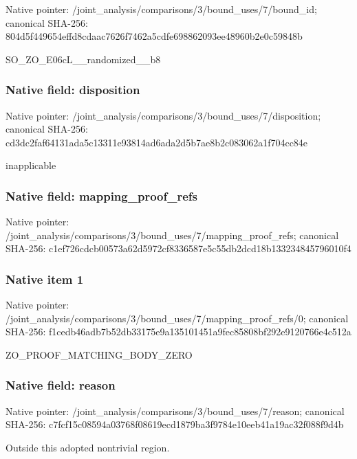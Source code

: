 \documentclass[10pt,a4paper]{article}
\begin{document}
Native pointer: /joint\_analysis/comparis\allowbreak{}ons/3/bound\_uses/7/bound\allowbreak{}\_id; canonical SHA-256: 804d5f449654effd8cdaac76\allowbreak{}26f7462a5cdfe698862093ee\allowbreak{}48960b2e0c59848b


SO\_ZO\_E06cL\_\_randomized\_\_b8


\subsubsection{Native field: disposition}


Native pointer: /joint\_analysis/comparis\allowbreak{}ons/3/bound\_uses/7/dispo\allowbreak{}sition; canonical SHA-256: cd3dc2faf64131ada5c13311\allowbreak{}e93814ad6ada2d5b7ae8b2c0\allowbreak{}83062a1f704cc84e


inapplicable


\subsubsection{Native field: mapping\_proof\_refs}


Native pointer: /joint\_analysis/comparis\allowbreak{}ons/3/bound\_uses/7/mappi\allowbreak{}ng\_proof\_refs; canonical SHA-256: c1ef726cdcb00573a62d5972\allowbreak{}cf8336587e5c55db2dcd18b1\allowbreak{}33234845796010f4



\subsubsection{Native item 1}


Native pointer: /joint\_analysis/comparis\allowbreak{}ons/3/bound\_uses/7/mappi\allowbreak{}ng\_proof\_refs/0; canonical SHA-256: f1cedb46adb7b52db33175e9\allowbreak{}a135101451a9fec85808bf29\allowbreak{}2e9120766e4c512a


ZO\_PROOF\_MATCHING\_BODY\_ZERO


\subsubsection{Native field: reason}


Native pointer: /joint\_analysis/comparis\allowbreak{}ons/3/bound\_uses/7/reaso\allowbreak{}n; canonical SHA-256: c7fcf15c08594a03768f0861\allowbreak{}9ecd1879ba3f9784e10eeb41\allowbreak{}a19ac32f088f9d4b


Outside this adopted nontrivial region.
\end{document}
